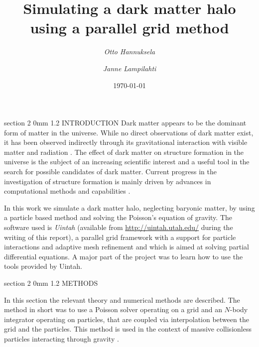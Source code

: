 \documentclass[notitlepage, 12pt]{article}
\title{Simulating a dark matter halo using a parallel grid method}
\author{{\em Otto Hannuksela} \and {\em Janne Lampilahti}}
\date{\today}
\makeatletter
\renewcommand{\section}{\@startsection       %
        {section}
        {2}
        {0mm}
        {1.2\baselineskip}
        {\baselineskip}
        {\centering\normalsize}}
\makeatother
\begin{document}
\maketitle
\section{INTRODUCTION}
Dark matter appears to be the dominant form of matter in the universe. While no direct observations of dark matter exist, it has been observed indirectly through its gravitational interaction with visible matter and radiation \citep{Roos2010}. The effect of dark matter on structure formation in the universe is the subject of an increasing scientific interest and a useful tool in the search for possible candidates of dark matter. Current progress in the investigation of structure formation is mainly driven by advances in computational methods and capabilities \citep{Kuhlen2012}. 

In this work we simulate a dark matter halo, neglecting baryonic matter, by using a particle based method and solving the Poisson's equation of gravity. The software used is {\em Uintah} (available from \url{http://uintah.utah.edu/} during the writing of this report), a parallel grid framework with a support for particle interactions and adaptive mesh refinement and which is aimed at solving partial differential equations. A major part of the project was to learn how to use the tools provided by Uintah.

\section{METHODS} \label{sec:methods}

In this section the relevant theory and numerical methods are described. The method in short was to use a Poisson solver operating on a grid and an $N$-body integrator operating on particles, that are coupled via interpolation between the grid and the particles. This method is used in the context of massive collisionless particles interacting through gravity \citep[e.g.][]{Hockney1985}.  

\end{document}
